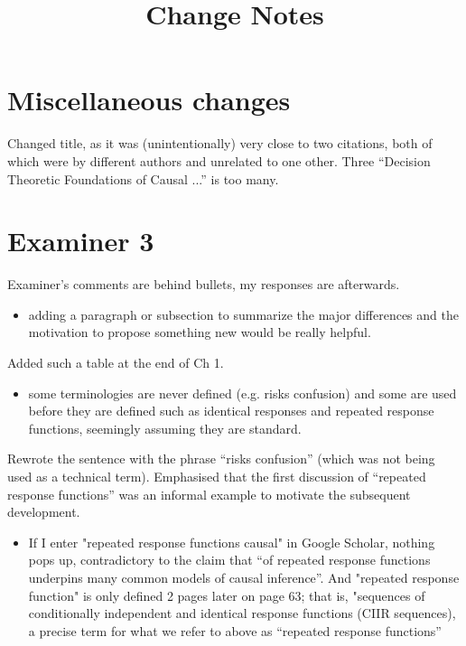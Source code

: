 \documentclass[12pt, a4paper]{article}
\title{Change Notes}
\begin{document}
\maketitle
\section{Miscellaneous changes}

Changed title, as it was (unintentionally) very close to two citations, both of which were by different authors and unrelated to one other. Three ``Decision Theoretic Foundations of Causal ...'' is too many.

\section{Examiner 3}
Examiner's comments are behind bullets, my responses are afterwards.

\begin{itemize}
    \item adding a paragraph or subsection to summarize the major differences and the motivation to propose something new would be really helpful.
\end{itemize}

Added such a table at the end of Ch 1.

\begin{itemize}
    \item some terminologies are never defined (e.g. risks confusion) and some are used before they are defined such as identical responses and repeated response functions, seemingly assuming they are standard.
\end{itemize}


Rewrote the sentence with the phrase ``risks confusion'' (which was not being used as a technical term). Emphasised that the first discussion of ``repeated response functions'' was an informal example to motivate the subsequent development.

\begin{itemize}
    \item If I enter "repeated response functions causal" in Google Scholar, nothing pops up, contradictory to the claim that “of repeated response functions underpins many common models of causal inference”. And "repeated response function" is only defined 2 pages later on page 63; that is, "sequences of conditionally independent and identical response functions (CIIR sequences), a precise term for what we refer to above as “repeated response functions”
\end{itemize}
\end{document}
